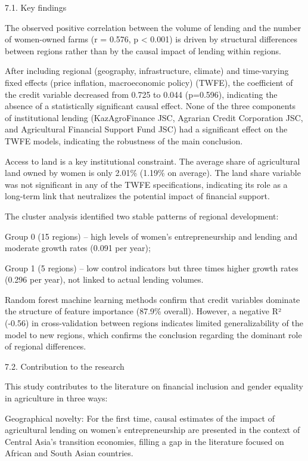 \documentclass[
]{article}
\begin{document}
7.1. Key findings

The observed positive correlation between the volume of lending and the
number of women-owned farms (r = 0.576, p \textless{} 0.001) is driven
by structural differences between regions rather than by the causal
impact of lending within regions.

After including regional (geography, infrastructure, climate) and
time-varying fixed effects (price inflation, macroeconomic policy)
(TWFE), the coefficient of the credit variable decreased from 0.725 to
0.044 (p=0.596), indicating the absence of a statistically significant
causal effect. None of the three components of institutional lending
(KazAgroFinance JSC, Agrarian Credit Corporation JSC, and Agricultural
Financial Support Fund JSC) had a significant effect on the TWFE models,
indicating the robustness of the main conclusion.

Access to land is a key institutional constraint. The average share of
agricultural land owned by women is only 2.01\% (1.19\% on average). The
land share variable was not significant in any of the TWFE
specifications, indicating its role as a long-term link that neutralizes
the potential impact of financial support.

The cluster analysis identified two stable patterns of regional
development:

Group 0 (15 regions) -- high levels of women's entrepreneurship and
lending and moderate growth rates (0.091 per year);

Group 1 (5 regions) -- low control indicators but three times higher
growth rates (0.296 per year), not linked to actual lending volumes.

Random forest machine learning methods confirm that credit variables
dominate the structure of feature importance (87.9\% overall). However,
a negative R² (-0.56) in cross-validation between regions indicates
limited generalizability of the model to new regions, which confirms the
conclusion regarding the dominant role of regional differences.

7.2. Contribution to the research

This study contributes to the literature on financial inclusion and
gender equality in agriculture in three ways:

Geographical novelty: For the first time, causal estimates of the impact
of agricultural lending on women's entrepreneurship are presented in the
context of Central Asia's transition economies, filling a gap in the
literature focused on African and South Asian countries.
\end{document}
